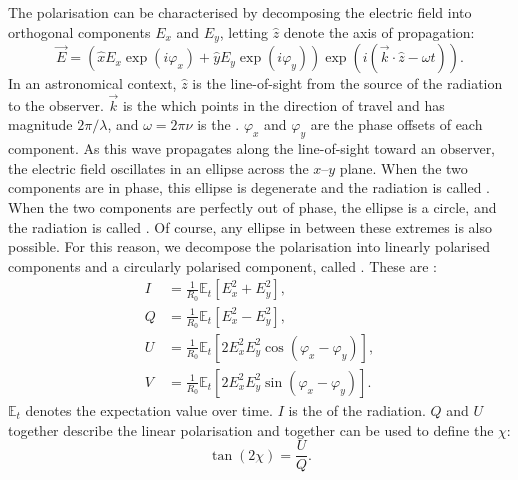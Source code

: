         The polarisation can be characterised by decomposing the electric field into orthogonal components $E_x$ and $E_y$, letting $\hat z$ denote the axis of propagation:
        \begin{equation}
            \vec E = (\hat x E_x \exp(i \varphi_x) + \hat y E_y \exp(i \varphi_y)) \exp(i (\vec k \cdot \hat z - \omega t)).
        \end{equation}
        In an astronomical context, $\hat z$ is the line-of-sight from the source of the radiation to the observer. $\vec k$ is the  which points in the direction of travel and has magnitude $2\pi/\lambda$, and $\omega = 2\pi\nu$ is the . $\varphi_x$ and $\varphi_y$ are the phase offsets of each component. As this wave propagates along the line-of-sight toward an observer, the electric field oscillates in an ellipse across the $x$--$y$ plane. When the two components are in phase, this ellipse is degenerate and the radiation is called . When the two components are perfectly out of phase, the ellipse is a circle, and the radiation is called . Of course, any ellipse in between these extremes is also possible. For this reason, we decompose the polarisation into linearly polarised components and a circularly polarised component, called . These are \citep{condon_essential_2016}:
        \begin{align}
            \label{eq:stokes-i}
            I &= \frac{1}{R_0} \mathbb E_t[E_x^2 + E_y^2],\\
            \label{eq:stokes-q}
            Q &= \frac{1}{R_0} \mathbb E_t[E_x^2 - E_y^2],\\
            \label{eq:stokes-u}
            U &= \frac{1}{R_0} \mathbb E_t[2 E_x^2 E_y^2 \cos (\varphi_x - \varphi_y)],\\
            \label{eq:stokes-v}
            V &= \frac{1}{R_0} \mathbb E_t[2 E_x^2 E_y^2 \sin (\varphi_x - \varphi_y)].
        \end{align}
        $\mathbb E_t$ denotes the expectation value over time. $I$ is the  of the radiation. $Q$ and $U$ together describe the linear polarisation and together can be used to define the  $\chi$:
        \begin{equation}
            \label{eq:polarisation-angle}
            \tan (2 \chi) = \frac{U}{Q}.
        \end{equation}
